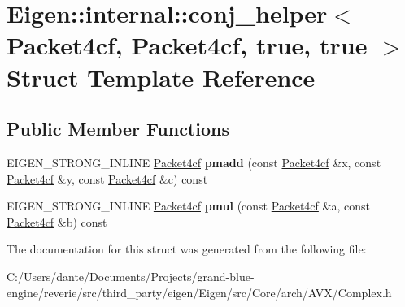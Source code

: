 \hypertarget{struct_eigen_1_1internal_1_1conj__helper_3_01_packet4cf_00_01_packet4cf_00_01true_00_01true_01_4}{}\section{Eigen\+::internal\+::conj\+\_\+helper$<$ Packet4cf, Packet4cf, true, true $>$ Struct Template Reference}
\label{struct_eigen_1_1internal_1_1conj__helper_3_01_packet4cf_00_01_packet4cf_00_01true_00_01true_01_4}
\subsection*{Public Member Functions}
\begin{DoxyCompactItemize}
\item 
\mbox{\label{struct_eigen_1_1internal_1_1conj__helper_3_01_packet4cf_00_01_packet4cf_00_01true_00_01true_01_4_a4edcd637a905735fd9d8f0158eaa5fe3}} 
E\+I\+G\+E\+N\+\_\+\+S\+T\+R\+O\+N\+G\+\_\+\+I\+N\+L\+I\+NE \mbox{\hyperlink{struct_eigen_1_1internal_1_1_packet4cf}{Packet4cf}} {\bfseries pmadd} (const \mbox{\hyperlink{struct_eigen_1_1internal_1_1_packet4cf}{Packet4cf}} \&x, const \mbox{\hyperlink{struct_eigen_1_1internal_1_1_packet4cf}{Packet4cf}} \&y, const \mbox{\hyperlink{struct_eigen_1_1internal_1_1_packet4cf}{Packet4cf}} \&c) const
\item 
\mbox{\label{struct_eigen_1_1internal_1_1conj__helper_3_01_packet4cf_00_01_packet4cf_00_01true_00_01true_01_4_aaaa36dbafeef9a405bbd0dead0fa4d9d}} 
E\+I\+G\+E\+N\+\_\+\+S\+T\+R\+O\+N\+G\+\_\+\+I\+N\+L\+I\+NE \mbox{\hyperlink{struct_eigen_1_1internal_1_1_packet4cf}{Packet4cf}} {\bfseries pmul} (const \mbox{\hyperlink{struct_eigen_1_1internal_1_1_packet4cf}{Packet4cf}} \&a, const \mbox{\hyperlink{struct_eigen_1_1internal_1_1_packet4cf}{Packet4cf}} \&b) const
\end{DoxyCompactItemize}


The documentation for this struct was generated from the following file\+:\begin{DoxyCompactItemize}
\item 
C\+:/\+Users/dante/\+Documents/\+Projects/grand-\/blue-\/engine/reverie/src/third\+\_\+party/eigen/\+Eigen/src/\+Core/arch/\+A\+V\+X/Complex.\+h\end{DoxyCompactItemize}
